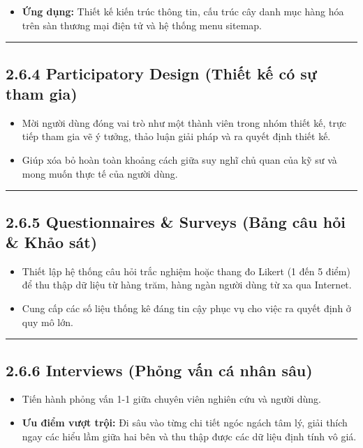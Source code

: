 \documentclass[11pt,a4paper,oneside]{report}
\begin{document}
\begin{itemize}[leftmargin=1.5em]
\item \textbf{Ứng dụng:} Thiết kế kiến trúc thông tin, cấu trúc cây danh mục hàng hóa trên sàn thương mại điện tử và hệ thống menu sitemap.
\end{itemize}

\bigskip\hrule\bigskip

\subsection{2.6.4 Participatory Design (Thiết kế có sự tham gia)}
\begin{itemize}[leftmargin=1.5em]
\item Mời người dùng đóng vai trò như một thành viên trong nhóm thiết kế, trực tiếp tham gia vẽ ý tưởng, thảo luận giải pháp và ra quyết định thiết kế.
\item Giúp xóa bỏ hoàn toàn khoảng cách giữa suy nghĩ chủ quan của kỹ sư và mong muốn thực tế của người dùng.
\end{itemize}

\bigskip\hrule\bigskip

\subsection{2.6.5 Questionnaires \& Surveys (Bảng câu hỏi \& Khảo sát)}
\begin{itemize}[leftmargin=1.5em]
\item Thiết lập hệ thống câu hỏi trắc nghiệm hoặc thang đo Likert (1 đến 5 điểm) để thu thập dữ liệu từ hàng trăm, hàng ngàn người dùng từ xa qua Internet.
\item Cung cấp các số liệu thống kê đáng tin cậy phục vụ cho việc ra quyết định ở quy mô lớn.
\end{itemize}

\bigskip\hrule\bigskip

\subsection{2.6.6 Interviews (Phỏng vấn cá nhân sâu)}
\begin{itemize}[leftmargin=1.5em]
\item Tiến hành phỏng vấn 1-1 giữa chuyên viên nghiên cứu và người dùng.
\item \textbf{Ưu điểm vượt trội:} Đi sâu vào từng chi tiết ngóc ngách tâm lý, giải thích ngay các hiểu lầm giữa hai bên và thu thập được các dữ liệu định tính vô giá.
\end{itemize}
\end{document}
